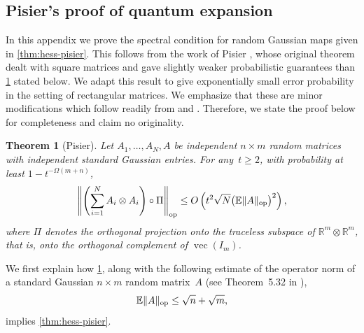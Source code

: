 \documentclass[aos]{imsart}
\newtheorem{theorem}{Theorem}[section]
\theoremstyle{definition}
\numberwithin{equation}{section}
\DeclareMathOperator{\op}{op}
\DeclareMathOperator{\vect}{vec}
\DeclarePairedDelimiter{\norm}{\lVert}{\rVert}
\newcommand{\R}{{\mathbb{R}}}
\newcommand{\ot}{\otimes}
\newcommand{\E}{\mathbb{E}}
\begin{document}
\begin{appendix}

\section{Pisier's proof of quantum expansion}\label{sec:pisier}
In this appendix we prove the spectral condition for random Gaussian maps given in \cref{thm:hess-pisier}. 
This follows from the work of Pisier \cite{pisier2012grothendieck}, whose original theorem dealt with square matrices and gave slightly weaker probabilistic guarantees than \cref{thm:Pisier-expansion} stated below. We adapt this result to give exponentially small error probability in the setting of rectangular matrices. We emphasize that these are minor modifications which follow readily from \cite{P14} and \cite{pisier2012grothendieck}. Therefore, we state the proof below for completeness and claim no originality. 

\begin{theorem}[Pisier]\label{thm:Pisier-expansion}
Let $A_1,\dots,A_N,A$ be independent $n \times m$ random matrices with independent standard Gaussian entries.
For any~$t \geq 2$, with probability at least $1 - t^{-\Omega(m+n)}$,
\begin{align*}
  \norm*{\left(\sum_{i=1}^N A_i \otimes A_i \right) \circ \Pi}_{\op}
  \leq O\left( t^2 \sqrt{N} \bigl( \E \norm{A}_{\op} \bigr)^2 \right),
\end{align*}
where $\Pi$ denotes the orthogonal projection onto the traceless subspace of $\R^m \ot \R^m$, that is, onto the orthogonal complement of $\vect(I_m)$.
\end{theorem}

We first explain how \cref{thm:Pisier-expansion}, along with the following estimate of the operator norm of a standard Gaussian $n \times m$ random matrix~$A$ (see Theorem~5.32 in \cite{vershynin2010introduction}),
\begin{equation}\label{eq:op norm upper bound}
  \E \norm{A}_{\op} \leq \sqrt{n} + \sqrt{m},
\end{equation}
implies \cref{thm:hess-pisier}.


\end{appendix}
\end{document}
